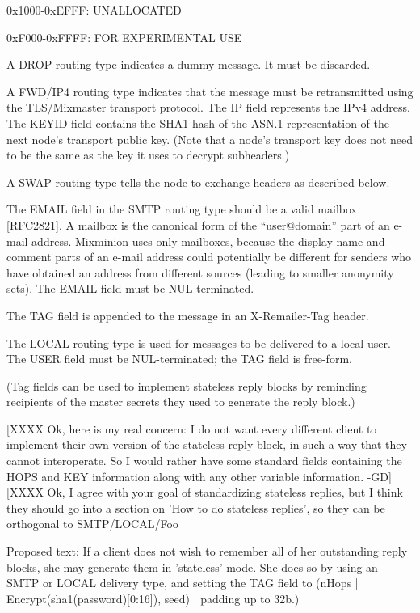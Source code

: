 0x1000-0xEFFF: UNALLOCATED

0xF000-0xFFFF: FOR EXPERIMENTAL USE

A DROP routing type indicates a dummy message. It must be discarded.

A FWD/IP4 routing type indicates that the message must be
retransmitted using the TLS/Mixmaster transport protocol. The IP field
represents the IPv4 address.  The KEYID field contains the SHA1 hash
of the ASN.1 representation of the next node's transport public key.
(Note that a node's transport key does not need to be the same as the
key it uses to decrypt subheaders.)

A SWAP routing type tells the node to exchange headers as described below.

The EMAIL field in the SMTP routing type should be a valid mailbox
[RFC2821]. A mailbox is the canonical form of the ``user@domain''
part of an e-mail address. Mixminion uses only mailboxes, because the
display name and comment parts of an e-mail address could potentially be
different for senders who have obtained an address from different
sources (leading to smaller anonymity sets). The EMAIL field must be
NUL-terminated.

The TAG field is appended to the message in an X-Remailer-Tag header.

The LOCAL routing type is used for messages to be delivered to a local
user.  The USER field must be NUL-terminated; the TAG field is
free-form.

(Tag fields can be used to implement stateless reply blocks by
reminding recipients of the master secrets they used to generate the
reply block.)

[XXXX Ok, here is my real concern: I do not want every different client
      to implement their own version of the stateless reply block, in
such a way that they cannot interoperate. So I would rather have some 
standard fields containing the HOPS and KEY information along with any
other variable information. -GD]
[XXXX Ok, I agree with your goal of standardizing stateless replies,
      but I think they should go into a section on 'How to do
      stateless replies', so they can be orthogonal to SMTP/LOCAL/Foo  

      Proposed text:
         If a client does not wish to remember all of her outstanding
         reply blocks, she may generate them in 'stateless' mode.  She  
         does so by using an SMTP or LOCAL delivery type, and setting
         the TAG field to 
           (nHops | Encrypt(sha1(password)[0:16]), seed) | padding up to 32b.)

